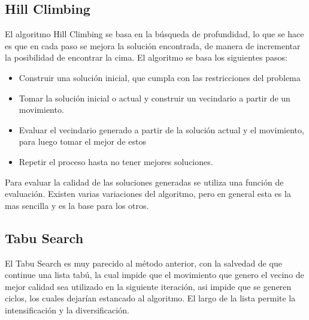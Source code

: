 \documentclass[letter, 10pt]{article}
\begin{document}
\subsection{Hill Climbing}
El algoritmo Hill Climbing se basa en la b\'usqueda de profundidad, lo que se hace es que en cada paso se mejora la soluci\'on encontrada, de manera 
de incrementar la posibilidad de encontrar la cima.
El algoritmo se basa los siguientes pasos\cite{HC}:
\begin{itemize}
 \item Construir una soluci\'on inicial, que cumpla con las restricciones del problema
 \item Tomar la soluci\'on inicial o actual y construir un vecindario a partir de un movimiento.
 \item Evaluar el vecindario generado a partir de la soluci\'on actual y el movimiento, para luego tomar el mejor de estos
 \item Repetir el proceso hasta no tener mejores soluciones.
\end{itemize}
Para evaluar la calidad de las soluciones generadas se utiliza una funci\'on de evaluaci\'on.
Existen varias variaciones del algoritmo, pero en general esta es la mas sencilla y es la base para los otros.

\subsection{Tabu Search}
El Tabu Search es muy parecido al m\'etodo anterior, con la salvedad de que continue una lista tab\'u, la cual impide que el movimiento que genero el
vecino de mejor calidad sea utilizado en la siguiente iteraci\'on, asi impide que se generen ciclos, los cuales dejar\'ian estancado al algoritmo.
\newline
El largo de la lista permite la intensificaci\'on y la diversificaci\'on.
\end{document}
